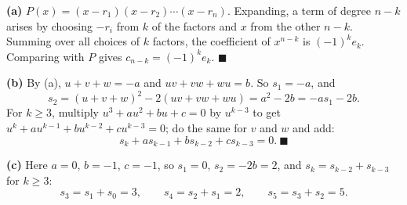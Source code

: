 \textbf{(a)} $P(x)=(x-r_1)(x-r_2)\cdots(x-r_n)$. Expanding, a term of degree $n-k$ arises by choosing $-r_i$ from $k$ of the factors and $x$ from the other $n-k$. Summing over all choices of $k$ factors, the coefficient of $x^{n-k}$ is $(-1)^ke_k$. Comparing with $P$ gives $c_{n-k}=(-1)^ke_k$. $\blacksquare$

\textbf{(b)} By (a), $u+v+w=-a$ and $uv+vw+wu=b$. So $s_1=-a$, and
\[s_2=(u+v+w)^2-2(uv+vw+wu)=a^2-2b=-as_1-2b.\]
For $k\ge3$, multiply $u^3+au^2+bu+c=0$ by $u^{k-3}$ to get $u^k+au^{k-1}+bu^{k-2}+cu^{k-3}=0$; do the same for $v$ and $w$ and add:
\[s_k+as_{k-1}+bs_{k-2}+cs_{k-3}=0.\ \blacksquare\]

\textbf{(c)} Here $a=0$, $b=-1$, $c=-1$, so $s_1=0$, $s_2=-2b=2$, and $s_k=s_{k-2}+s_{k-3}$ for $k\ge3$:
\[s_3=s_1+s_0=3,\qquad s_4=s_2+s_1=2,\qquad s_5=s_3+s_2=\boxed{5}.\]
